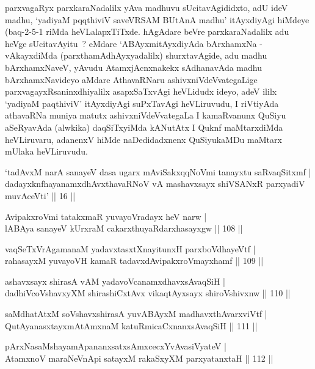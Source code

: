 \begin{artha}
parxvagaRyx parxkaraNadalilx yAva madhuvu 
sUcitavAgididxto, adU ideV madhu, `yadiyaM pqqthiviV saveVRSAM BUtAnA madhu' itAyxdiyAgi hiMdeye
(baq-2-5-1 riMda heVLalapxTiTxde. hAgAdare beVre parxkaraNadalilx adu
heVge sUcitavAyitu~? eMdare `ABAyxmitAyxdiyAda bArxhamxNa - vAkayxdiMda (parxthamAdhAyxyadalilx) shurxtavAgide, adu madhu
bArxhamxNaveV, yAvudu AtamxjAcnxnakekx sAdhanavAda madhu
bArxhamxNavideyo aMdare AthavaRNaru ashivxniVdeVvategaLige
parxvagayxRsaninxdhiyalilx asapxSaTxvAgi heVLidudx ideyo, adeV ililx
`yadiyaM paqthiviV' itAyxdiyAgi suPxTavAgi heVLiruvudu, I riVtiyAda athavaRNa
muniya matutx ashivxniVdeVvategaLa I kamaRvanunx QuSiyu aSeRyavAda
(alwkika) daqSiTxyiMda kANutAtx I Quknf maMtarxdiMda heVLiruvaru,
adanenxV hiMde naDedidadxnenx QuSiyukaMDu maMtarx mUlaka heVLiruvudu.
\end{artha}


\begin{shl}
`tadAvxM narA sanayeV dasa ugarx mAviSakxqqNoVmi tanayxtu saRvaqSitxmf | dadayxknfhayanamxdhAvxthavaRNoV vA mashavxsayx shiVSANxR parxyadiV muvAceVti' || 16 ||
\end{shl}


\begin{shl}
AvipakxroVmi tatakxmaR yuvayoVradayx heV narw |\\
lABAya sanayeV kUrxraM cakarxthuyaRdarxhasayxgw \hfill || 108 ||
\end{shl}
\begin{shl}
vaqSeTxVrAgamanaM yadavxtasxtXnayitunxH parxboVdhayeVtf |\\
rahasayxM yuvayoVH kamaR tadavxdAvipakxroVmayxhamf \hfill || 109 ||
\end{shl}
\begin{shl}
ashavxsayx shirasA vAM yadavoVcanamxdhavxsAvaqSiH |\\
dadhiVcoV\s shavxyXM shirashiCxtAvx vikaqtAyxsayx shiroV\s shivxnw \hfill || 110 ||
\end{shl}
\begin{shl}
saMdhatAtxM soV\s shavxshirasA yuvABAyxM madhavxthAvarxviVtf |\\
QutAyanasxtayxmAtAmxnaM katuRmicaCxnanxsAvaqSiH \hfill || 111 ||
\end{shl}
\begin{shl}
pArxNasaMshayamApananxsatxsAmxcecxYvAvasiVyateV |\\
AtamxnoV maraNeVnApi satayxM rakaSxyXM parxyatanxtaH \hfill || 112 ||
\end{shl}

